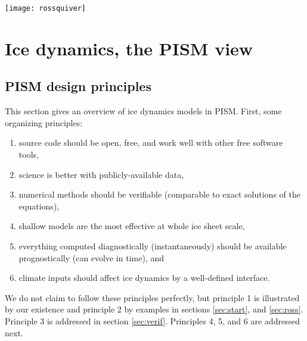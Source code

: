 \documentclass[titlepage,letterpaper,final]{scrartcl}
\begin{document}
\vspace{.3in}
  
\begin{center}
\texttt{[image: rossquiver]}
\end{center}

\vspace{.2in}

\begin{center}
\end{center}


\clearpage\newpage



\clearpage
\newpage
\section{Ice dynamics, the PISM view}\label{sec:dynamics}

\subsection{PISM design principles}  This section gives an overview of ice dynamics models in PISM.  First, some organizing principles:
\begin{enumerate}
\item source code should be open, free, and work well with other free software tools,
\item science is better with publicly-available data,
\item numerical methods should be verifiable (comparable to exact solutions of the equations),
\item shallow models are the most effective at whole ice sheet scale,
\item everything computed diagnostically (instantaneously) should be available prognostically (can evolve in time), and
\item climate inputs should affect ice dynamics by a well-defined interface.
\end{enumerate}

\noindent We do not claim to follow these principles perfectly, but principle 1 is illustrated by our existence and principle 2 by examples in sections \ref{sec:start}, and \ref{sec:ross}.  Principle 3 is addressed in section \ref{sec:verif}.  Principles 4, 5, and 6 are addressed next.
\end{document}
